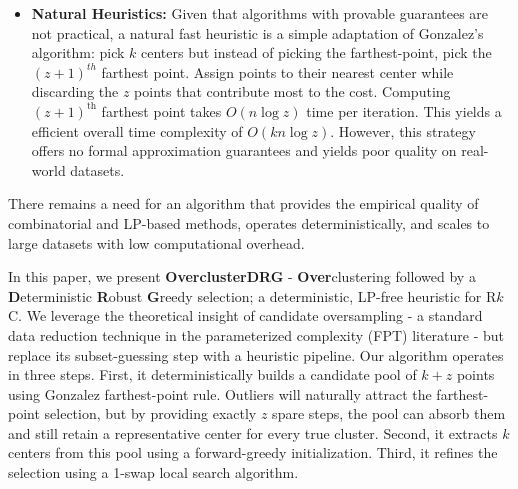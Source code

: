 \documentclass[twoside,leqno,twocolumn]{article}
\newcommand{\rkc}{R$k$C}
\begin{document}
\begin{itemize}
   \item \textbf{Natural Heuristics:} Given that algorithms with provable guarantees are not practical, a natural fast heuristic is a simple adaptation of Gonzalez's algorithm: pick $k$ centers but instead of picking the farthest-point, pick the $(z+1)^{th}$ farthest point. Assign points to their nearest center while discarding the $z$ points that contribute most to the cost. Computing $(z+1)^{\text{th}}$ farthest point takes $O(n \log z)$ time per iteration. This yields a efficient overall time complexity of $O(kn \log z)$. However, this strategy offers no formal approximation guarantees and yields poor quality on real-world datasets.
\end{itemize}

There remains a need for an algorithm that provides the empirical quality of combinatorial and LP-based methods, operates deterministically, and scales to large datasets with low computational overhead.

In this paper, we present \textbf{OverclusterDRG} - \textbf{Over}clustering
followed by a \textbf{D}eterministic \textbf{R}obust \textbf{G}reedy
selection; a deterministic, LP-free heuristic for \rkc. We leverage the theoretical insight of candidate oversampling - a standard data reduction technique in the parameterized complexity (FPT) literature - but replace its subset-guessing step with a heuristic pipeline.
Our algorithm operates in three steps. First, it deterministically builds a candidate pool of $k+z$ points using Gonzalez farthest-point rule. Outliers will naturally attract the farthest-point selection, but by providing exactly $z$ spare steps, the pool can absorb them and still retain a representative center for every true cluster. Second, it extracts $k$ centers from this pool using a forward-greedy initialization. Third, it refines the selection using a 1-swap local search algorithm.
\end{document}
